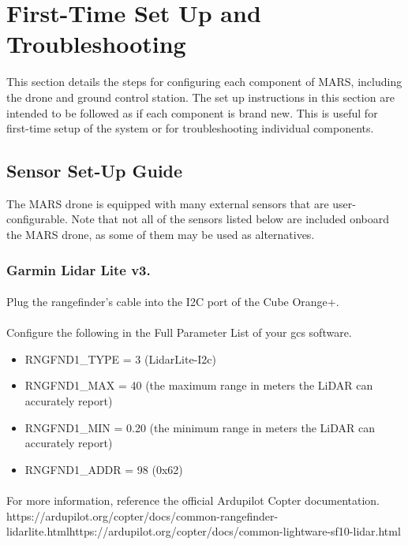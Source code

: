 \chapter{First-Time Set Up and Troubleshooting}
\label{ch:FirstTimeSetUp}

This section details the steps for configuring each component of MARS, including the drone and ground control station. The set up instructions in this section are intended to be followed as if each component is brand new. This is useful for first-time setup of the system or for troubleshooting individual components. 
    \section{Sensor Set-Up Guide} The MARS drone is equipped with many external sensors that are user-configurable. Note that not all of the sensors listed below are included onboard the MARS drone, as some of them may be used as alternatives.
        \subsection{Garmin Lidar Lite v3.}
            \subsubsection{} Plug the rangefinder’s cable into the I2C port of the Cube Orange+.
            \subsubsection{} Configure the following in the Full Parameter List of your \ac{gcs} software.
                \begin{itemize}
                    \item RNGFND1\_TYPE = 3 (LidarLite-I2c)
                    \item RNGFND1\_MAX = 40 (the maximum range in meters the LiDAR can accurately report) 
                    \item RNGFND1\_MIN = 0.20 (the minimum range in meters the LiDAR can accurately report) 
                    \item RNGFND1\_ADDR = 98 (0x62)
                \end{itemize}
                
            \subsubsection{} For more information, reference the official Ardupilot Copter documentation. https://ardupilot.org/copter/docs/common-rangefinder-lidarlite.htmlhttps://ardupilot.org/copter/docs/common-lightware-sf10-lidar.html
            
